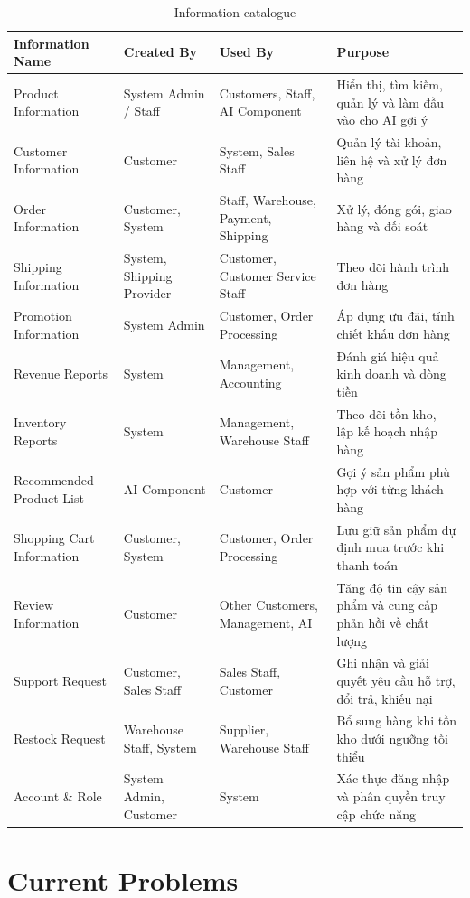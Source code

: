 \documentclass[12pt,a4paper,oneside]{report}
\begin{document}
\begin{longtable}{p{3.3cm}p{2.9cm}p{3.6cm}p{6.2cm}}
\caption{Information catalogue}\\
\toprule
\textbf{Information Name} & \textbf{Created By} & \textbf{Used By} & \textbf{Purpose} \\
\midrule
\endhead
\bottomrule
\endlastfoot
Product Information & System Admin / Staff & Customers, Staff, AI Component & Hiển thị, tìm kiếm, quản lý và làm đầu vào cho AI gợi ý \\
Customer Information & Customer & System, Sales Staff & Quản lý tài khoản, liên hệ và xử lý đơn hàng \\
Order Information & Customer, System & Staff, Warehouse, Payment, Shipping & Xử lý, đóng gói, giao hàng và đối soát \\
Shipping Information & System, Shipping Provider & Customer, Customer Service Staff & Theo dõi hành trình đơn hàng \\
Promotion Information & System Admin & Customer, Order Processing & Áp dụng ưu đãi, tính chiết khấu đơn hàng \\
Revenue Reports & System & Management, Accounting & Đánh giá hiệu quả kinh doanh và dòng tiền \\
Inventory Reports & System & Management, Warehouse Staff & Theo dõi tồn kho, lập kế hoạch nhập hàng \\
Recommended Product List & AI Component & Customer & Gợi ý sản phẩm phù hợp với từng khách hàng \\
Shopping Cart Information & Customer, System & Customer, Order Processing & Lưu giữ sản phẩm dự định mua trước khi thanh toán \\
Review Information & Customer & Other Customers, Management, AI & Tăng độ tin cậy sản phẩm và cung cấp phản hồi về chất lượng \\
Support Request & Customer, Sales Staff & Sales Staff, Customer & Ghi nhận và giải quyết yêu cầu hỗ trợ, đổi trả, khiếu nại \\
Restock Request & Warehouse Staff, System & Supplier, Warehouse Staff & Bổ sung hàng khi tồn kho dưới ngưỡng tối thiểu \\
Account \& Role & System Admin, Customer & System & Xác thực đăng nhập và phân quyền truy cập chức năng \\
\end{longtable}

\section{Current Problems}
\end{document}

